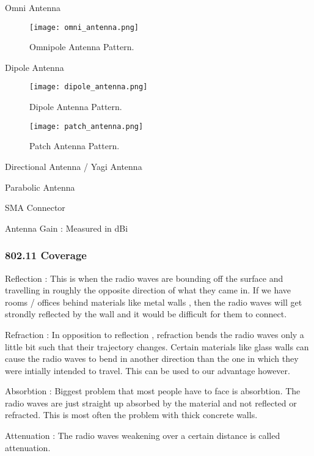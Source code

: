 Omni Antenna
\begin{figure}[h!]
  \texttt{[image: omni\_antenna.png]}
  \caption{Omnipole Antenna Pattern.}
  \label{fig:placeholder}
\end{figure}





Dipole Antenna
\begin{figure}[h!]
  \texttt{[image: dipole\_antenna.png]}
  \caption{Dipole Antenna Pattern.}
  \label{fig:placeholder}
\end{figure}


\begin{figure}[h!]
  \texttt{[image: patch\_antenna.png]}
  \caption{Patch Antenna Pattern.}
  \label{fig:placeholder}
\end{figure}

Directional Antenna / Yagi Antenna

Parabolic Antenna

SMA Connector

Antenna Gain : Measured in dBi
\subsubsectionend

\subsubsection{802.11 Coverage}
\label{sssec:802_11_coverage}


Reflection : This is when the radio waves are bounding off the surface and
travelling in roughly the opposite direction of what they came in. If we have
rooms / offices behind materials like metal walls , then the radio waves will
get strondly reflected by the wall and it would be difficult for them to
connect.

Refraction : In opposition to reflection , refraction bends the radio waves only
a little bit such that their trajectory changes. Certain materials like glass
walls can cause the radio waves to bend in another direction than the one in
which they were intially intended to travel. This can be used to our advantage
however.

Absorbtion : Biggest problem that most people have to face is absorbtion. The
radio waves are just straight up absorbed by the material and not reflected or
refracted. This is most often the problem with thick concrete walls.

Attenuation : The radio waves weakening over a certain distance is called
attenuation.

